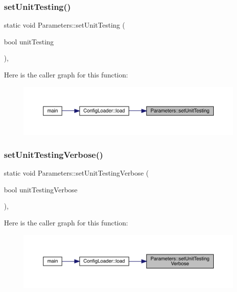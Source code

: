 \subsubsection{\texorpdfstring{setUnitTesting()}{setUnitTesting()}}
{\footnotesize\ttfamily static void Parameters\+::set\+Unit\+Testing (\begin{DoxyParamCaption}\item[{bool}]{unit\+Testing }\end{DoxyParamCaption})\hspace{0.3cm}{\ttfamily [inline]}, {\ttfamily [static]}}

Here is the caller graph for this function\+:\nopagebreak
\begin{figure}[H]
\begin{center}
\leavevmode
\includegraphics[width=350pt]{class_parameters_a2d7077c967fffbdc6652559ec261b67c_icgraph}
\end{center}
\end{figure}
\mbox{\label{class_parameters_a2cf1ae12581e8f80dd88ce6c60f37c5f}} 
\subsubsection{\texorpdfstring{setUnitTestingVerbose()}{setUnitTestingVerbose()}}
{\footnotesize\ttfamily static void Parameters\+::set\+Unit\+Testing\+Verbose (\begin{DoxyParamCaption}\item[{bool}]{unit\+Testing\+Verbose }\end{DoxyParamCaption})\hspace{0.3cm}{\ttfamily [inline]}, {\ttfamily [static]}}

Here is the caller graph for this function\+:\nopagebreak
\begin{figure}[H]
\begin{center}
\leavevmode
\includegraphics[width=350pt]{class_parameters_a2cf1ae12581e8f80dd88ce6c60f37c5f_icgraph}
\end{center}
\end{figure}
\mbox{\label{class_parameters_aa0ac9d09db506844758e0a5d23dedeb4}} 
